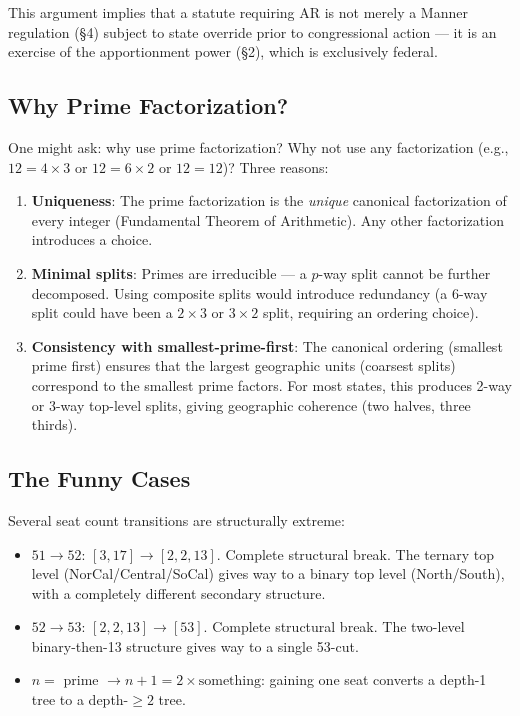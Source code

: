 This argument implies that a statute requiring AR is not merely a Manner
regulation (\S4) subject to state override prior to congressional action
--- it is an exercise of the apportionment power (\S2), which is exclusively
federal.

\subsection{Why Prime Factorization?}
\label{sec:discussion:why-primes}

One might ask: why use prime factorization? Why not use any factorization
(e.g., $12 = 4 \times 3$ or $12 = 6 \times 2$ or $12 = 12$)? Three reasons:

\begin{enumerate}
  \item \textbf{Uniqueness}: The prime factorization is the \emph{unique}
        canonical factorization of every integer (Fundamental Theorem of
        Arithmetic). Any other factorization introduces a choice.
  \item \textbf{Minimal splits}: Primes are irreducible --- a $p$-way split
        cannot be further decomposed. Using composite splits would introduce
        redundancy (a $6$-way split could have been a $2\times 3$ or
        $3\times 2$ split, requiring an ordering choice).
  \item \textbf{Consistency with smallest-prime-first}: The canonical ordering
        (smallest prime first) ensures that the largest geographic units
        (coarsest splits) correspond to the smallest prime factors. For most
        states, this produces 2-way or 3-way top-level splits, giving
        geographic coherence (two halves, three thirds).
\end{enumerate}

\subsection{The Funny Cases}
\label{sec:discussion:funny}

Several seat count transitions are structurally extreme:
\begin{itemize}
  \item $51 \to 52$: $[3, 17] \to [2, 2, 13]$. Complete structural break.
        The ternary top level (NorCal/Central/SoCal) gives way to a binary
        top level (North/South), with a completely different secondary
        structure.
  \item $52 \to 53$: $[2, 2, 13] \to [53]$. Complete structural break.
        The two-level binary-then-13 structure gives way to a single 53-cut.
  \item $n = $ prime $\to n+1 = 2 \times \text{something}$: gaining one seat
        converts a depth-1 tree to a depth-$\geq 2$ tree.
\end{itemize}


